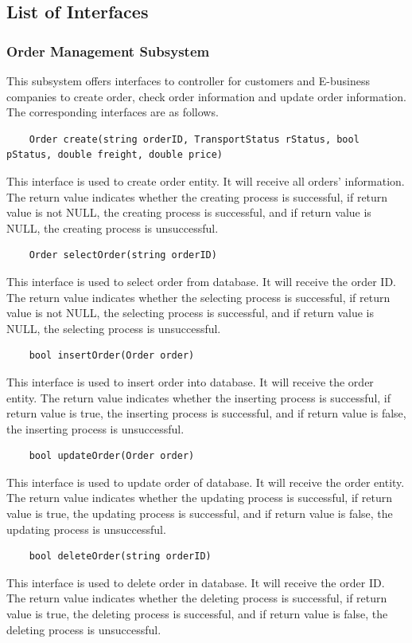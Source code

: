 \documentclass[12pt]{scrreprt}
\begin{document}
\subsection{List of Interfaces}
\subsubsection{Order Management Subsystem}
This subsystem offers interfaces to controller for customers and E-business companies to create order, check order information and update order information. The corresponding interfaces are as follows.
\begin{lstlisting}
	Order create(string orderID, TransportStatus rStatus, bool pStatus, double freight, double price)
\end{lstlisting}
This interface is used to create order entity. It will receive all orders’ information.  The return value indicates whether the creating process is successful, if return value is not NULL, the creating process is successful, and if return value is NULL, the creating process is unsuccessful.
\begin{lstlisting}
	Order selectOrder(string orderID)
\end{lstlisting}
This interface is used to select order from database. It will receive the order ID. The return value indicates whether the selecting process is successful, if return value is not NULL, the selecting process is successful, and if return value is NULL, the selecting process is unsuccessful.
\begin{lstlisting}
	bool insertOrder(Order order)
\end{lstlisting}
This interface is used to insert order into database. It will receive the order entity. The return value indicates whether the inserting process is successful, if return value is true, the inserting process is successful, and if return value is false, the inserting process is unsuccessful.
\begin{lstlisting}
	bool updateOrder(Order order)
\end{lstlisting}
This interface is used to update order of database. It will receive the order entity. The return value indicates whether the updating  process is successful, if return value is true, the updating  process is successful, and if return value is false, the updating  process is unsuccessful.
\begin{lstlisting}
	bool deleteOrder(string orderID)
\end{lstlisting}
This interface is used to delete order in database. It will receive the order ID. The return value indicates whether the deleting  process is successful, if return value is true, the deleting  process is successful, and if return value is false, the deleting  process is unsuccessful.
\end{document}
